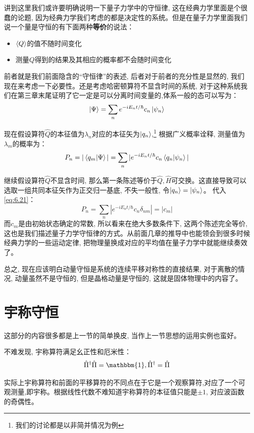 讲到这里我们或许要明确说明一下量子力学中的守恒律, 这在经典力学里面是个很蠢的论题, 因为经典力学我们考虑的都是决定性的系统。但是在量子力学里面我们说一个量是守恒的有下面两种\textbf{等价}的说法：
\begin{itemize}
    \item $\braket{Q}$的值不随时间变化
    \item 测量$Q$得到的结果及其相应的概率都不会随时间变化
\end{itemize}

前者就是我们前面隐含的“守恒律”的表述, 后者对于前者的充分性是显然的, 我们现在来考虑一下必要性。还是考虑哈密顿算符不显含时间的系统, 对于这种系统我们在第三章末尾证明了它一定是可以分离时间变量的,体系一般的态可以写为：
\[\ket{\Psi}=\sum_n e^{-iE_nt/\hbar} c_n\ket{\psi_n}\]

现在假设算符$\hat{Q}$的本征值为$\lambda_n$对应的本征矢为$\ket{q_n}$,\footnote{我们的讨论都是以非简并情况为例} 根据广义概率诠释, 测量值为$\lambda_m$的概率为：
\begin{equation}
    \label{eq:6.21}
    P_n=|\braket{q_m|\Psi}|=\sum_n|e^{-iE_nt/\hbar}c_n\braket{q_n|\psi_n}|
\end{equation}

继续假设算符$\hat{Q}$不显含时间, 那么第一条陈述等价于$\hat{Q},\hat{H}$可交换。这直接导致可以选取一组共同本征矢作为正交归一基底, 不失一般性, 令$\ket{q_n}=\ket{\psi_n}$。
代入\ref{eq:6.21}：
\begin{equation}
    P_n=\sum_n|e^{-iE_nt/\hbar}c_n\delta_{nm}|=|c_m|
\end{equation}
而$c_m$是由初始状态确定的常数, 所以看来在绝大多数条件下, 这两个陈述完全等价, 这也是我们描述量子力学守恒律的方式。从前面几章的推导中也能领会到很多时候经典力学的一些运动定律, 
把物理量换成对应的平均值在量子力学中就能继续奏效了。

总之, 现在应该明白动量守恒是系统的连续平移对称性的直接结果, 对于离散的情况, 动量虽然不是守恒的, 但是晶格动量是守恒的, 这就是固体物理中的内容了。

\section{宇称守恒}
这部分的内容很多都是上一节的简单换皮, 当作上一节思想的运用实例也蛮好。

不难发现, 宇称算符满足幺正性和厄米性：
\[\hat{\Pi}^\dagger\hat{\Pi}=\mathbbm{1},\hat{\Pi}^\dagger=\hat{\Pi}\]

实际上宇称算符和前面的平移算符的不同点在于它是一个观察算符,对应了一个可观测量,即宇称。根据线性代数不难知道宇称算符的本征值只能是$\pm 1$, 对应波函数的奇偶性。

